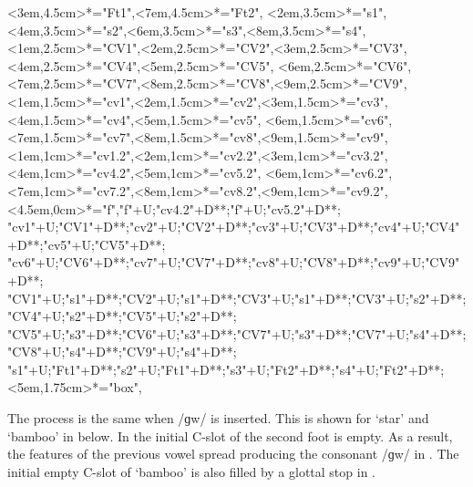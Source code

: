\begin{multicols}{2}
\begin{exe}
{\begin{xlist}
{		<3em,4.5cm>*="Ft1",<7em,4.5cm>*="Ft2",
		<2em,3.5cm>*="s1",<4em,3.5cm>*="s2",<6em,3.5cm>*="s3",<8em,3.5cm>*="s4",
		<1em,2.5cm>*="CV1",<2em,2.5cm>*="CV2",<3em,2.5cm>*="CV3",<4em,2.5cm>*="CV4",<5em,2.5cm>*="CV5",
		<6em,2.5cm>*="CV6",<7em,2.5cm>*="CV7",<8em,2.5cm>*="CV8",<9em,2.5cm>*="CV9",
		<1em,1.5cm>*="cv1",<2em,1.5cm>*="cv2",<3em,1.5cm>*\as{ }="cv3",<4em,1.5cm>*="cv4",<5em,1.5cm>*\as{\j}="cv5",
		<6em,1.5cm>*="cv6",<7em,1.5cm>*\as{ }="cv7",<8em,1.5cm>*="cv8",<9em,1.5cm>*\as{ }="cv9",
		<1em,1cm>*="cv1.2",<2em,1cm>*="cv2.2",<3em,1cm>*\as{ }="cv3.2",<4em,1cm>*="cv4.2",<5em,1cm>*\as{\j}="cv5.2",
		<6em,1cm>*="cv6.2",<7em,1cm>*\as{ }="cv7.2",<8em,1cm>*="cv8.2",<9em,1cm>*\as{ }="cv9.2",
		<4.5em,0cm>*\as{\tsc{[+fr.]}}="f","f"+U;"cv4.2"+D**\dir{-};"f"+U;"cv5.2"+D**\dir{-};
		"cv1"+U;"CV1"+D**\dir{-};"cv2"+U;"CV2"+D**\dir{-};"cv3"+U;"CV3"+D**\dir{};"cv4"+U;"CV4"+D**\dir{-};"cv5"+U;"CV5"+D**\dir{-};
		"cv6"+U;"CV6"+D**\dir{-};"cv7"+U;"CV7"+D**\dir{};"cv8"+U;"CV8"+D**\dir{-};"cv9"+U;"CV9"+D**\dir{};
		"CV1"+U;"s1"+D**\dir{-};"CV2"+U;"s1"+D**\dir{-};"CV3"+U;"s1"+D**\dir{-};"CV3"+U;"s2"+D**\dir{-};"CV4"+U;"s2"+D**\dir{-};"CV5"+U;"s2"+D**\dir{-};
		"CV5"+U;"s3"+D**\dir{-};"CV6"+U;"s3"+D**\dir{-};"CV7"+U;"s3"+D**\dir{-};"CV7"+U;"s4"+D**\dir{-};"CV8"+U;"s4"+D**\dir{-};"CV9"+U;"s4"+D**\dir{-};
		"s1"+U;"Ft1"+D**\dir{-};"s2"+U;"Ft1"+D**\dir{-};"s3"+U;"Ft2"+D**\dir{-};"s4"+U;"Ft2"+D**\dir{-};
		<5em,1.75cm>*="box",
	\endxy}\label{as:niij=ee2}
	\end{xlist}}
\end{exe}
\end{multicols}

The process is the same when /ɡw/ is inserted.
This is shown for  {\ra}  `star'
and  {\ra}  `bamboo' in  below.
In  the initial C-slot of the second foot is empty.
As a result, the features  of the previous vowel spread
producing the consonant /ɡw/ in .
The initial empty C-slot of  `bamboo'
is also filled by a glottal stop in .

